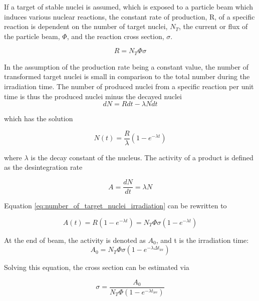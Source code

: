 If a target of stable nuclei is assumed, which is exposed to a particle beam which induces various nuclear reactions, the constant rate of production, R, of a specific reaction is dependent on the number of target nuclei, $N_T$, the current or flux of the particle beam, $\Phi$, and the reaction cross section, $\sigma$. 

\begin{equation}
    R = N_T \Phi \sigma
\end{equation}

In the assumption of the production rate being a constant value, the number of transformed target nuclei is small in comparison to the total number during the irradiation time. The number of produced nuclei from a specific reaction per unit time is thus the produced nuclei minus the decayed nuclei
\begin{equation}
    dN = Rdt - \lambda N dt
\end{equation}

which has the solution

\begin{equation} \label{eq:number_of_target_nuclei_irradiation}
    N(t) = \frac{R}{\lambda}(1-e^{-\lambda t})
\end{equation}

where $\lambda$ is the decay constant of the nucleus. The activity of a product is defined as the desintegration rate 

\begin{equation} \label{eq:activity_dN/dt_lambdaN}
    A= \frac{dN}{dt} = \lambda N
\end{equation}

Equation \ref{eq:number_of_target_nuclei_irradiation} can be rewritten to

\begin{equation} 
    A(t) = R(1-e^{-\lambda t}) = N_T \Phi \sigma (1-e^{-\lambda t})
\end{equation}

At the end of beam, the activity is denoted as $A_0$, and t is the irradiation time:
\begin{equation} \label{eq:activity_eob}
    A_0 = N_T \Phi \sigma (1-e^{-\lambda \Delta t_\text{irr}})
\end{equation}

Solving this equation, the cross section can be estimated via

\begin{equation}
    \sigma = \frac{A_0}{N_T \Phi (1-e^{-\lambda t_\text{iee}})}
\end{equation}

